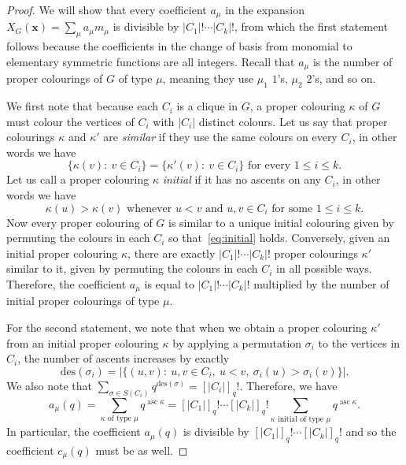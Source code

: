 \documentclass[12pt]{amsart}  %
\theoremstyle{definition}
\theoremstyle{remark}
\numberwithin{equation}{section}
\DeclareMathOperator{\asc}{asc}
\begin{document}
\begin{proof}
We will show that every coefficient $a_\mu$ in the expansion $X_G(\bm x)=\sum_\mu a_\mu m_\mu$ is divisible by $|C_1|!\cdots|C_k|!$, from which the first statement follows because the coefficients in the change of basis from monomial to elementary symmetric functions are all integers. Recall that $a_\mu$ is the number of proper colourings of $G$ of type $\mu$, meaning they use $\mu_1$ $1$'s, $\mu_2$ $2$'s, and so on.

We first note that because each $C_i$ is a clique in $G$, a proper colouring $\kappa$ of $G$ must colour the vertices of $C_i$ with $|C_i|$ distinct colours. Let us say that proper colourings $\kappa$ and $\kappa'$ are \emph{similar} if they use the same colours on every $C_i$, in other words we have
$$
\{\kappa(v): \ v\in C_i\}=\{\kappa'(v): \ v\in C_i\}\text{ for every }1\leq i\leq k.
$$
Let us call a proper colouring $\kappa$ \emph{initial} if it has no ascents on any $C_i$, in other words we have
\begin{equation}\label{eq:initial}
\kappa(u)>\kappa(v)\text{ whenever }u<v\text{ and }u,v\in C_i\text{ for some }1\leq i\leq k.
\end{equation}
Now every proper colouring of $G$ is similar to a unique initial colouring given by permuting the colours in each $C_i$ so that~\eqref{eq:initial} holds. Conversely, given an initial proper colouring $\kappa$, there are exactly $|C_1|!\cdots|C_k|!$ proper colourings $\kappa'$ similar to it, given by permuting the colours in each $C_i$ in all possible ways. Therefore, the coefficient $a_\mu$ is equal to $|C_1|!\cdots|C_k|!$ multiplied by the number of initial proper colourings of type $\mu$.

For the second statement, we note that when we obtain a proper colouring $\kappa'$ from an initial proper colouring $\kappa$ by applying a permutation $\sigma_i$ to the vertices in $C_i$, the number of ascents increases by exactly \begin{equation}\text{des}(\sigma_i)=|\{(u,v): \ u,v\in C_i, \ u<v, \ \sigma_i(u)>\sigma_i(v)\}|.\end{equation}
We also note that $\sum_{\sigma\in S(C_i)}q^{\text{des}(\sigma)}=[|C_i|]_q!$. Therefore, we have
$$
a_\mu(q)=\sum_{\kappa\text{ of type }\mu}q^{\asc\kappa}=[|C_1|]_q!\cdots[|C_k|]_q!\sum_{\kappa\text{ initial of type }\mu} q^{\asc\kappa}.
$$
In particular, the coefficient $a_\mu(q)$ is divisible by $[|C_1|]_q!\cdots[|C_k|]_q!$ and so the coefficient $c_\mu(q)$ must be as well.
\end{proof}
\end{document}
